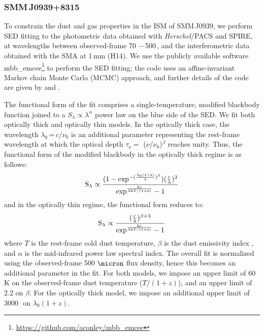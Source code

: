 \documentclass[iop]{emulateapj}
\begin{document}
\subsubsection{SMM\,J0939+8315} \label{sec:SEDBg}
To constrain the dust and gas properties in the ISM of SMM\,J0939, we perform SED fitting to the
photometric data obtained with {\it Herschel}/PACS and SPIRE, at wavelengths
between observed-frame 70\,\micron\,$-$\,500\,\micron, and the interferometric data obtained with the SMA at 1\,mm (H14). We use the publicly
available software {\sc mbb\_emcee}\footnote{\url{https://github.com/aconley/mbb\_emcee}} to perform the SED fitting; the code uses an affine-invariant Markov chain Monte
Carlo (MCMC) approach, and further details of the code are given by \citet{Riechers13a} and \citet{Dowell14a}. \par
The
functional form of the fit comprises a single-temperature, modified blackbody function joined to a $S_{\lambda} \propto \lambda^\alpha
$ power law on the blue
side of the SED.
We fit both optically thick and optically thin models. In the optically thick case, the wavelength $
\lambda_0$\,=\,${c}/{\nu_0}$ is an additional parameter representing the rest-frame wavelength at which the optical
depth $\tau_{\nu} =$ ($\nu$/$\nu_0$)$^\beta$ reaches unity. Thus, the functional form of the modified blackbody
in the optically thick regime is as follows:
\begin{equation}
\rm S_{\lambda} \propto \frac{(1-exp^{-(\frac{\lambda_0 (1+z)}{\lambda})^{\beta}})(\frac{c}{\lambda})^3}
{exp^{\frac{hc}{\lambda\rm{kT/(1+z)} } }-1}
\end{equation}
and in the optically thin regime, the functional form reduces to:
\begin{equation}
\rm S_{\lambda} \propto \frac{(\frac{c}{\lambda})^{\beta+3}}{exp^{\frac{hc}{\lambda\rm{kT/(1+z)}}}-1}
\end{equation}
where $T$ is the rest-frame cold dust temperature, $\beta$ is the dust emissivity index 
, and $\alpha$ is the mid-infrared power law spectral index. The overall fit is normalized using the observed-frame 500
$\micron$ flux density, hence this becomes an additional parameter in the fit. For both models, we impose an upper limit of 60 K on the observed-frame dust temperature ($T/(1+z)$), and an upper limit of 2.2 on
$\beta$. For the optically thick model, we impose an additional upper limit of 3000\,\micron\ on $\lambda_0 (1+z)$.
\end{document}
